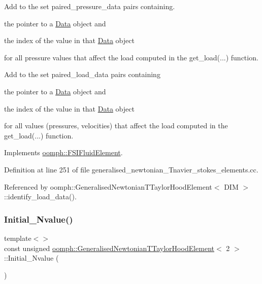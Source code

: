 Add to the set {\ttfamily paired\+\_\+pressure\+\_\+data} pairs containing. 


\begin{DoxyItemize}
\item the pointer to a \hyperlink{classoomph_1_1Data}{Data} object and
\item the index of the value in that \hyperlink{classoomph_1_1Data}{Data} object
\end{DoxyItemize}for all pressure values that affect the load computed in the {\ttfamily get\+\_\+load}(...) function.

Add to the set {\ttfamily paired\+\_\+load\+\_\+data} pairs containing
\begin{DoxyItemize}
\item the pointer to a \hyperlink{classoomph_1_1Data}{Data} object and
\item the index of the value in that \hyperlink{classoomph_1_1Data}{Data} object
\end{DoxyItemize}for all values (pressures, velocities) that affect the load computed in the {\ttfamily get\+\_\+load}(...) function. 

Implements \hyperlink{classoomph_1_1FSIFluidElement_af8e0805b769b7d111eb71f223fc83df8}{oomph\+::\+F\+S\+I\+Fluid\+Element}.



Definition at line 251 of file generalised\+\_\+newtonian\+\_\+\+Tnavier\+\_\+stokes\+\_\+elements.\+cc.



Referenced by oomph\+::\+Generalised\+Newtonian\+T\+Taylor\+Hood\+Element$<$ D\+I\+M $>$\+::identify\+\_\+load\+\_\+data().

\mbox{\label{classoomph_1_1GeneralisedNewtonianTTaylorHoodElement_ab1a7f38270a1c40e6116b5ef8a003c0c}} 
\subsubsection{\texorpdfstring{Initial\+\_\+\+Nvalue()}{Initial\_Nvalue()}\hspace{0.1cm}{\footnotesize\ttfamily [1/2]}}
{\footnotesize\ttfamily template$<$$>$ \\
const unsigned \hyperlink{classoomph_1_1GeneralisedNewtonianTTaylorHoodElement}{oomph\+::\+Generalised\+Newtonian\+T\+Taylor\+Hood\+Element}$<$ 2 $>$\+::Initial\+\_\+\+Nvalue (\begin{DoxyParamCaption}{ }\end{DoxyParamCaption})\hspace{0.3cm}{\ttfamily [private]}}




